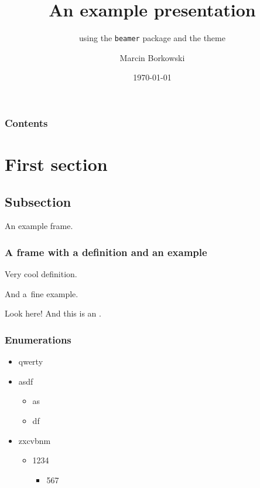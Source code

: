 \documentclass{beamer}
\begin{document}
\author{Marcin Borkowski}
\title{An example presentation}
\subtitle{using the \texttt{beamer} package and the  theme}
\date{\today}

\begin{frame}
  \maketitle
\end{frame}

\begin{frame}
  \frametitle{Contents}
  \tableofcontents
\end{frame}

\section{First section}

\subsection{Subsection}
\begin{frame}
  An example frame.
\end{frame}

\begin{frame}
  \frametitle{A frame with a definition and an example}
  \begin{definition}
    Very \alert{cool} definition.
  \end{definition}
  \begin{example}
    And a~fine example.
  \end{example}
  \begin{alertblock}{Look here!}
    And this is an .
  \end{alertblock}
\end{frame}

\begin{frame}[label=enumerations]
  \frametitle{Enumerations}
  \begin{itemize}[<+->]
  \item qwerty
  \item asdf
    \begin{itemize}[<+->]
    \item as
    \item df
    \end{itemize}
  \item zxcvbnm
    \begin{itemize}[<+->]
    \item 1234
      \begin{itemize}[<+->]
      \item 567
      \end{itemize}
    \end{itemize}
  \end{itemize}
\end{frame}
\end{document}
